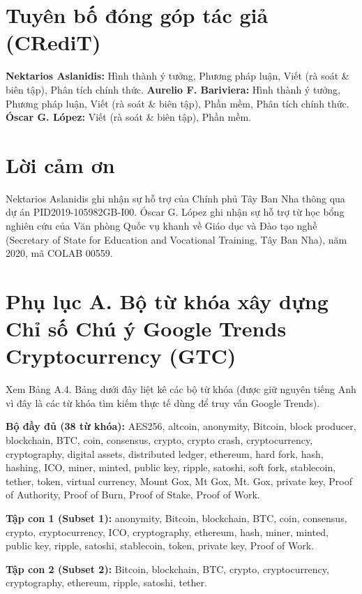 \section{Tuyên bố đóng góp tác giả (CRediT)}

\textbf{Nektarios Aslanidis:} Hình thành ý tưởng, Phương pháp luận, Viết (rà soát \& biên tập), Phân tích chính thức. \textbf{Aurelio F. Bariviera:} Hình thành ý tưởng, Phương pháp luận, Viết (rà soát \& biên tập), Phần mềm, Phân tích chính thức. \textbf{Óscar G. López:} Viết (rà soát \& biên tập), Phần mềm.

\section{Lời cảm ơn}

Nektarios Aslanidis ghi nhận sự hỗ trợ của Chính phủ Tây Ban Nha thông qua dự án PID2019-105982GB-I00. Óscar G. López ghi nhận sự hỗ trợ từ học bổng nghiên cứu của Văn phòng Quốc vụ khanh về Giáo dục và Đào tạo nghề (Secretary of State for Education and Vocational Training, Tây Ban Nha), năm 2020, mã COLAB 00559.

\section{Phụ lục A. Bộ từ khóa xây dựng Chỉ số Chú ý Google Trends Cryptocurrency (GTC)}

Xem Bảng A.4. Bảng dưới đây liệt kê các bộ từ khóa (được giữ nguyên tiếng Anh vì đây là các từ khóa tìm kiếm thực tế dùng để truy vấn Google Trends).

\textbf{Bộ đầy đủ (38 từ khóa):} AES256, altcoin, anonymity, Bitcoin, block producer, blockchain, BTC, coin, consensus, crypto, crypto crash, cryptocurrency, cryptography, digital assets, distributed ledger, ethereum, hard fork, hash, hashing, ICO, miner, minted, public key, ripple, satoshi, soft fork, stablecoin, tether, token, virtual currency, Mount Gox, Mt Gox, Mt. Gox, private key, Proof of Authority, Proof of Burn, Proof of Stake, Proof of Work.

\textbf{Tập con 1 (Subset 1):} anonymity, Bitcoin, blockchain, BTC, coin, consensus, crypto, cryptocurrency, ICO, cryptography, ethereum, hash, miner, minted, public key, ripple, satoshi, stablecoin, token, private key, Proof of Work.

\textbf{Tập con 2 (Subset 2):} Bitcoin, blockchain, BTC, crypto, cryptocurrency, cryptography, ethereum, ripple, satoshi, tether.

